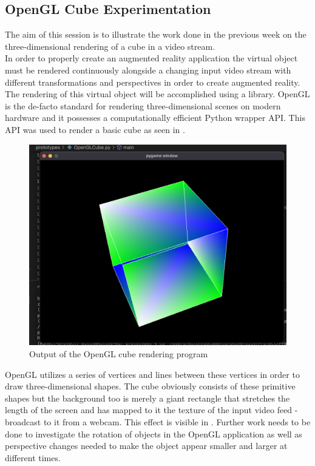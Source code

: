 \subsection{OpenGL Cube Experimentation}

The aim of this session is to illustrate the work done in the previous week on the three-dimensional rendering of a cube in a video stream. \\

In order to properly create an augmented reality application the virtual object must be rendered continuously alongside a changing input video stream with different transformations and perspectives in order to create augmented reality. The rendering of this virtual object will be accomplished using a library. OpenGL is the de-facto standard for rendering three-dimensional scenes on modern hardware and it possesses a computationally efficient Python wrapper API. This API was used to render a basic cube as seen in .\\

\begin{figure}[h]
    \centering
    \includegraphics[width=0.6\linewidth]{figures/OpenGL_cube.png}
    \caption{Output of the OpenGL cube rendering program}
    \label{fig:OpenGL_cube}
\end{figure}

OpenGL utilizes a series of vertices and lines between these vertices in order to draw three-dimensional shapes. The cube obviously consists of these primitive shapes but the background too is merely a giant rectangle that stretches the length of the screen and has mapped to it the texture of the input video feed - broadcast to it from a webcam. This effect is visible in . Further work needs to be done to investigate the rotation of objects in the OpenGL application as well as perspective changes needed to make the object appear smaller and larger at different times.\\

